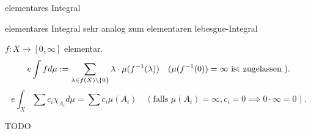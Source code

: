 \documentclass[class=article, crop=false]{standalone}
\begin{document}
\begin{zettel}{elementares Integral}
\begin{flashcard}[6m146u9w]{elementares Integral}
	sehr analog zum elementaren lebesgue-Integral
	\begin{definition}
		$f: X \to  [0,\infty]$ elementar.
		\[
			e \int f d\mu := \sum_{\lambda \in f(X) \setminus \set{0}} \lambda \cdot  \mu (f^{-1}(\lambda)) \quad (\mu(f^{-1}(0)) = \infty \tx{ist zugelassen} )
		.\]
		\[
			e \int_{X} \sum c_i \chi_{A_i} d\mu = \sum c_i \mu(A_i) \quad (\text{falls } \mu(A_i) = \infty, c_i = 0 \implies  0 \cdot  \infty = 0)
		.\]
	\end{definition}
\end{flashcard}

\begin{lemma}[Eigenschaften]
	TODO
\end{lemma}

\end{zettel}
\end{document}
